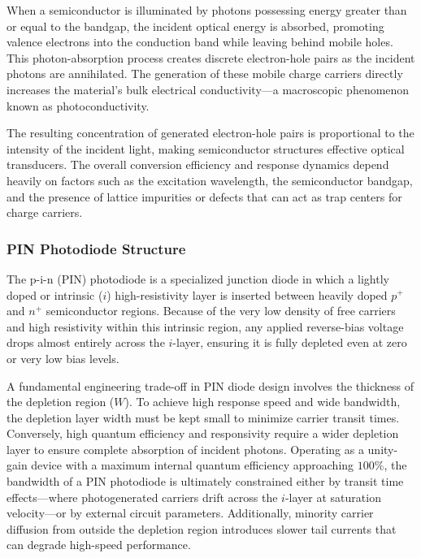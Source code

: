 When a semiconductor is illuminated by photons possessing energy greater than or equal to the bandgap, the incident optical energy is absorbed, promoting valence electrons into the conduction band while leaving behind mobile holes. This photon-absorption process creates discrete electron-hole pairs as the incident photons are annihilated. The generation of these mobile charge carriers directly increases the material's bulk electrical conductivity—a macroscopic phenomenon known as photoconductivity. 

The resulting concentration of generated electron-hole pairs is proportional to the intensity of the incident light, making semiconductor structures effective optical transducers. The overall conversion efficiency and response dynamics depend heavily on factors such as the excitation wavelength, the semiconductor bandgap, and the presence of lattice impurities or defects that can act as trap centers for charge carriers.

\subsubsection{PIN Photodiode Structure}
\label{sec:PIN_Photodiode}
The p-i-n (PIN) photodiode is a specialized junction diode in which a lightly doped or intrinsic ($i$) high-resistivity layer is inserted between heavily doped $p^+$ and $n^+$ semiconductor regions. Because of the very low density of free carriers and high resistivity within this intrinsic region, any applied reverse-bias voltage drops almost entirely across the $i$-layer, ensuring it is fully depleted even at zero or very low bias levels\cite[Chap 8.]{bhattacharyaSemiconductorOptoelectronicDevices1997}. 

A fundamental engineering trade-off in PIN diode design involves the thickness of the depletion region ($W$). To achieve high response speed and wide bandwidth, the depletion layer width must be kept small to minimize carrier transit times. Conversely, high quantum efficiency and responsivity require a wider depletion layer to ensure complete absorption of incident photons. Operating as a unity-gain device with a maximum internal quantum efficiency approaching $100\%$, the bandwidth of a PIN photodiode is ultimately constrained either by transit time effects—where photogenerated carriers drift across the $i$-layer at saturation velocity—or by external circuit parameters. Additionally, minority carrier diffusion from outside the depletion region introduces slower tail currents that can degrade high-speed performance\cite[Chap 8.]{bhattacharyaSemiconductorOptoelectronicDevices1997}.


